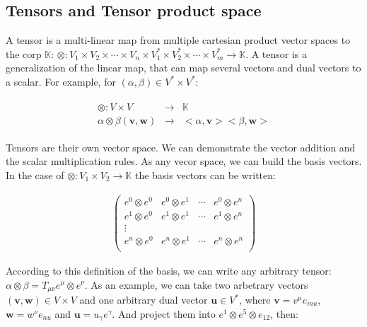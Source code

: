 \documentclass[final, paper=letter,5p,times,twocolumn]{elsarticle}
\theoremstyle{definition}
\begin{document}
\subsection{Tensors and Tensor product space}

A tensor is a multi-linear map from multiple cartesian product vector spaces to the corp $\mathbb{K}$: $\otimes : V_{1} \times V_{2} \times \cdots \times V_{n} \times V_{1}^{*} \times V_{2}^{*} \times \cdots \times V_{m}^{*} \rightarrow \mathbb{K}$. A tensor is a generalization of the linear map, that can map several vectors and dual vectors to a scalar. For example, for $(\alpha, \beta) \in V^{*} \times V^{*}$:

\begin{eqnarray*}
\begin{array}{rcl}
  \otimes : V \times V & \rightarrow & \mathbb{K} \\
  \alpha \otimes \beta(\bm{v},\bm{w}) & \rightarrow & <\alpha, \bm{v}><\beta, \bm{w}>
\end{array}
\end{eqnarray*}

Tensors are their own vector space. We can demonstrate the vector addition and the scalar multiplication rules. As any vecor space, we can build the basis vectors. In the case of $\otimes : V_{1} \times V_{2} \rightarrow \mathbb{K}$ the basis vectors can be written:

\begin{eqnarray*}
  \left( 
  \begin{array}{cccc}
    e^{0} \otimes e^{0} & e^{0} \otimes e^{1} & \cdots & e^{0} \otimes e^{n} \\ 
    e^{1} \otimes e^{0} & e^{1} \otimes e^{1} & \cdots & e^{1} \otimes e^{n} \\
    \vdots &&& \\
    e^{n} \otimes e^{0} & e^{n} \otimes e^{1} & \cdots & e^{n} \otimes e^{n} \\ 
  \end{array}
  \right)
\end{eqnarray*}

According to this definition of the basis, we can write any arbitrary tensor: $\alpha \otimes \beta = T_{\mu\nu}e^{\mu} \otimes e^{\nu}$. As an example, we can take two arbetrary vectors $(\bm{v}, \bm{w}) \in V \times V$ and one arbitrary dual vector $\bm{u} \in V^{*}$, where $\bm{v} = v^{\mu}e_{mu}$, $\bm{w} = w^{\nu}e_{nu}$ and $\bm{u} = u_{\gamma}e^{\gamma}$. And project them into $e^{1} \otimes e^{5}\otimes e_{12}$, then:
\end{document}
